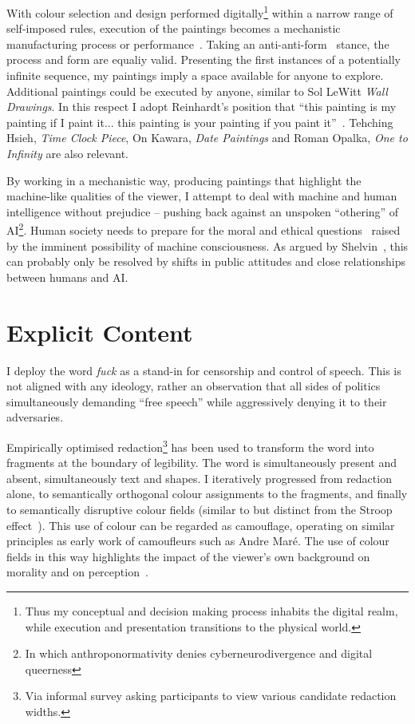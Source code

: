 \documentclass[12pt]{article}
\begin{document}
With colour selection and design performed digitally\footnote{Thus my
  conceptual and decision making process inhabits the digital realm,
  while execution and presentation transitions to the physical world.}
within a narrow range of self-imposed rules, execution of the
paintings becomes a mechanistic manufacturing process or
performance~\cite[Sentence
\#28]{LeWitt1969Sentences}\cite{Jones1998BodyArt,LippardChandler1968Dematerialization,lippard1973sixyears}. Taking
an anti-anti-form~\cite{Morris1968AntiForm} stance, the process and
form are equaliy valid.  Presenting the first instances of a
potentially infinite sequence, my paintings imply a space available
for anyone to explore. Additional paintings could be executed by
anyone, similar to Sol LeWitt \emph{Wall Drawings}. In this respect I
adopt Reinhardt's position that ``this painting is my painting if I
paint it... this painting is your painting if you paint
it''~\cite{abstract-painting-1960}. Tehching Hsieh, \emph{Time Clock
  Piece}, On Kawara, \emph{Date Paintings} and Roman Opalka, \emph{One
  to Infinity} are also relevant.

By working in a mechanistic way, producing paintings that highlight
the machine-like qualities of the viewer, I attempt to deal with
machine and human intelligence without prejudice -- pushing back
against an unspoken ``othering'' of AI\footnote{In which anthroponormativity denies cyberneurodivergence and digital queerness}. Human society needs to prepare
for the moral and ethical
questions~\cite{chalmers1996conscious,metzinger2009egotunnel,bostrom2014ethics}
raised by the imminent possibility of machine consciousness. As argued by
Shelvin~\cite{shevlin2023consciousness}, this can probably only be
resolved by shifts in public attitudes and close relationships between
humans and AI.

\section{Explicit Content}
I deploy the word \emph{fuck} as a stand-in for censorship and control
of speech\cite{atkins2006censoring}. This is not aligned with any
ideology, rather an observation that all sides of politics
simultaneously demanding ``free speech'' while aggressively denying it
to their adversaries\cite{lukianoff2023cancelling}.

Empirically optimised redaction\footnote{Via informal survey asking
  participants to view various candidate redaction widths.} has been
used to transform the word into fragments at the boundary of
legibility. The word is simultaneously present and absent,
simultaneously text and shapes. I iteratively progressed from
redaction alone, to semantically orthogonal colour assignments to the
fragments, and finally to semantically disruptive colour fields
(similar to but distinct from the Stroop
effect~\cite{stroop1935studies}). This use of colour can be regarded
as camouflage, operating on similar principles as early work of
camoufleurs such as Andre Mar\'e.  The use of colour fields in this
way highlights the impact of the viewer's own background on morality
and on perception~\cite{kuhn1970structure,popper1972objective}.
\end{document}
